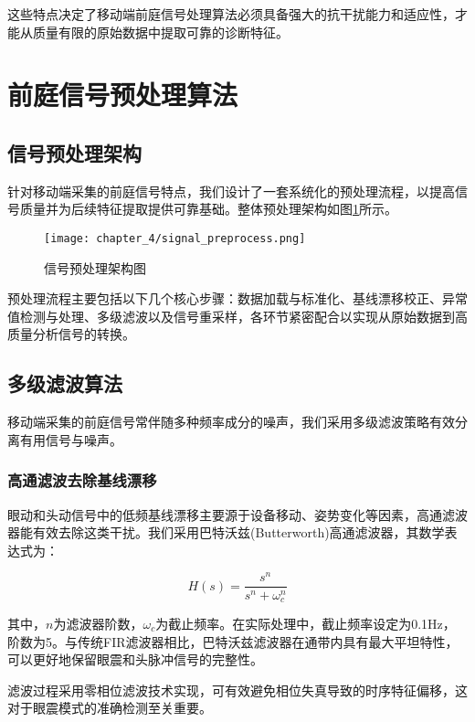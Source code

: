 这些特点决定了移动端前庭信号处理算法必须具备强大的抗干扰能力和适应性，才能从质量有限的原始数据中提取可靠的诊断特征。

\section{前庭信号预处理算法}

\subsection{信号预处理架构}

针对移动端采集的前庭信号特点，我们设计了一套系统化的预处理流程，以提高信号质量并为后续特征提取提供可靠基础。整体预处理架构如图\ref{fig:signal_preprocess}所示。

\begin{figure}[ht]
    \centering
    \texttt{[image: chapter\_4/signal\_preprocess.png]}
    \caption{信号预处理架构图}
    \label{fig:signal_preprocess}
\end{figure}

预处理流程主要包括以下几个核心步骤：数据加载与标准化、基线漂移校正、异常值检测与处理、多级滤波以及信号重采样，各环节紧密配合以实现从原始数据到高质量分析信号的转换。

\subsection{多级滤波算法}

移动端采集的前庭信号常伴随多种频率成分的噪声，我们采用多级滤波策略有效分离有用信号与噪声。

\subsubsection{高通滤波去除基线漂移}

眼动和头动信号中的低频基线漂移主要源于设备移动、姿势变化等因素，高通滤波器能有效去除这类干扰。我们采用巴特沃兹(Butterworth)高通滤波器，其数学表达式为：

\begin{equation}
H(s) = \frac{s^n}{s^n + \omega_c^n}
\end{equation}

其中，$n$为滤波器阶数，$\omega_c$为截止频率。在实际处理中，截止频率设定为0.1Hz，阶数为5。与传统FIR滤波器相比，巴特沃兹滤波器在通带内具有最大平坦特性，可以更好地保留眼震和头脉冲信号的完整性。

滤波过程采用零相位滤波技术实现，可有效避免相位失真导致的时序特征偏移，这对于眼震模式的准确检测至关重要。

